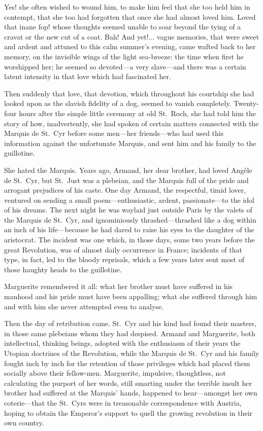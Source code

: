 \documentclass[paper=5.5in:8.5in,BCOR=7mm,twoside,DIV=calc,12pt,usegeometry,chapterprefix,endperiod,headings=big]{scrbook}
\begin{document}
Yes! she often wished to wound him, to make him feel that she too held him in contempt, that she too had forgotten that once she had almost loved him. Loved that inane fop! whose thoughts seemed unable to soar beyond the tying of a cravat or the new cut of a coat. Bah! And yet!... vague memories, that were sweet and ardent and attuned to this calm summer's evening, came wafted back to her memory, on the invisible wings of the light sea-breeze: the time when first he worshipped her; he seemed so devoted---a very slave---and there was a certain latent intensity in that love which had fascinated her.

Then suddenly that love, that devotion, which throughout his courtship she had looked upon as the slavish fidelity of a dog, seemed to vanish completely. Twenty-four hours after the simple little ceremony at old St.~Roch, she had told him the story of how, inadvertently, she had spoken of certain matters connected with the Marquis de St.~Cyr before some men---her friends---who had used this information against the unfortunate Marquis, and sent him and his family to the guillotine.

She hated the Marquis. Years ago, Armand, her dear brother, had loved Angèle de St.~Cyr, but St.~Just was a plebeian, and the Marquis full of the pride and arrogant prejudices of his caste. One day Armand, the respectful, timid lover, ventured on sending a small poem---enthusiastic, ardent, passionate---to the idol of his dreams. The next night he was waylaid just outside Paris by the valets of the Marquis de St.~Cyr, and ignominiously thrashed---thrashed like a dog within an inch of his life---because he had dared to raise his eyes to the daughter of the aristocrat. The incident was one which, in those days, some two years before the great Revolution, was of almost daily occurrence in France; incidents of that type, in fact, led to the bloody reprisals, which a few years later sent most of those haughty heads to the guillotine.

Marguerite remembered it all: what her brother must have suffered in his manhood and his pride must have been appalling; what she suffered through him and with him she never attempted even to analyse.

Then the day of retribution came. St.~Cyr and his kind had found their masters, in those same plebeians whom they had despised. Armand and Marguerite, both intellectual, thinking beings, adopted with the enthusiasm of their years the Utopian doctrines of the Revolution, while the Marquis de St.~Cyr and his family fought inch by inch for the retention of those privileges which had placed them socially above their fellow-men. Marguerite, impulsive, thoughtless, not calculating the purport of her words, still smarting under the terrible insult her brother had suffered at the Marquis’ hands, happened to hear---amongst her own coterie---that the St.~Cyrs were in treasonable correspondence with Austria, hoping to obtain the Emperor's support to quell the growing revolution in their own country.
\end{document}
